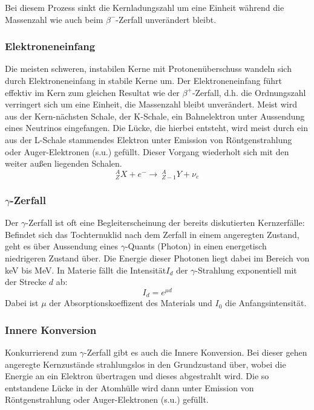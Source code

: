 \documentclass[12pt]{article}
\begin{document}
Bei diesem Prozess sinkt die Kernladungszahl um eine Einheit während die Massenzahl wie auch beim $\beta^-$-Zerfall unverändert bleibt.
\subsubsection{Elektroneneinfang}
Die meisten schweren, instabilen Kerne mit Protonenüberschuss wandeln sich durch Elektroneneinfang in stabile Kerne um.
Der Elektroneneinfang führt effektiv im Kern zum gleichen Resultat wie der $\beta^+$-Zerfall, d.h. die Ordnungszahl verringert sich um eine Einheit, die Massenzahl bleibt unverändert. Meist wird aus der Kern-nächsten Schale, der K-Schale, ein Bahnelektron unter Aussendung eines Neutrinos eingefangen. Die Lücke, die hierbei entsteht, wird meist durch ein aus der L-Schale stammendes Elektron unter Emission von Röntgenstrahlung oder Auger-Elektronen (s.u.) gefüllt. Dieser Vorgang wiederholt sich mit den weiter außen liegenden Schalen.
\[{}_Z^A X + e^- \rightarrow\ {}_{Z-1}^A Y + \nu_e\]
\subsubsection{$\gamma$-Zerfall}

Der $\gamma$-Zerfall ist oft eine Begleiterscheinung der bereits diskutierten Kernzerfälle: Befindet sich das Tochternuklid nach dem Zerfall in einem angeregten Zustand, geht es über Aussendung eines $\gamma$-Quants (Photon)  in einen energetisch niedrigeren Zustand über. Die Energie dieser Photonen liegt dabei im Bereich von keV bis MeV. In Materie fällt die Intensität$I_d$ der $\gamma$-Strahlung exponentiell mit der Strecke $d$ ab:
\[I_d=e^{\mu d}\]
Dabei ist $\mu$ der Absorptionskoeffizent des Materials und $I_0$ die Anfangsintensität.

\subsubsection{Innere Konversion}
Konkurrierend zum $\gamma$-Zerfall gibt es auch die Innere Konversion. Bei dieser gehen angeregte Kernzustände strahlungslos in den Grundzustand über, wobei die Energie an ein Elektron übertragen und dieses abgestrahlt wird. Die so entstandene Lücke in der Atomhülle wird dann unter Emission von Röntgenstrahlung oder Auger-Elektronen (s.u.) gefüllt.
\end{document}
